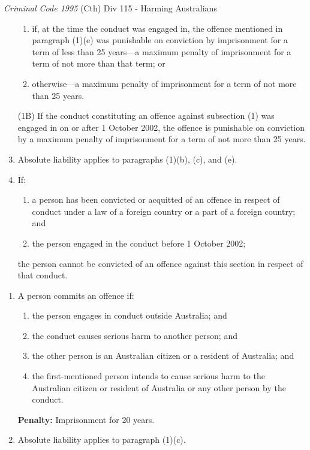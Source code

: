 \begin{statutedetails}{\textit{Criminal Code 1995} (Cth) Div 115 - Harming Australians}
\begin{enumerate}[label=(\arabic*)]
\begin{enumerate}[label=(\alph*)]
            \item if, at the time the conduct was engaged in, the offence mentioned in paragraph (1)(e) was punishable on conviction by imprisonment for a term of less than 25 years—a maximum penalty of imprisonment for a term of not more than that term; or
            \item otherwise—a maximum penalty of imprisonment for a term of not more than 25 years.
        \end{enumerate}
        \item[(1B)] If the conduct constituting an offence against subsection (1) was engaged in on or after 1 October 2002, the offence is punishable on conviction by a maximum penalty of imprisonment for a term of not more than 25 years.
        \item Absolute liability applies to paragraphs (1)(b), (c), and (e).
        \item If:
        \begin{enumerate}[label=(\alph*)]
            \item a person has been convicted or acquitted of an offence in respect of conduct under a law of a foreign country or a part of a foreign country; and
            \item the person engaged in the conduct before 1 October 2002;
        \end{enumerate}
        the person cannot be convicted of an offence against this section in respect of that conduct.
    \end{enumerate}

    \begin{enumerate}[label=(\arabic*)]
        \item A person commits an offence if:
        \begin{enumerate}[label=(\alph*)]
            \item the person engages in conduct outside Australia; and
            \item the conduct causes serious harm to another person; and
            \item the other person is an Australian citizen or a resident of Australia; and
            \item the first-mentioned person intends to cause serious harm to the Australian citizen or resident of Australia or any other person by the conduct.
        \end{enumerate}
        \par \textbf{Penalty:} Imprisonment for 20 years.
        \item Absolute liability applies to paragraph (1)(c).
    \end{enumerate}


\end{statutedetails}

